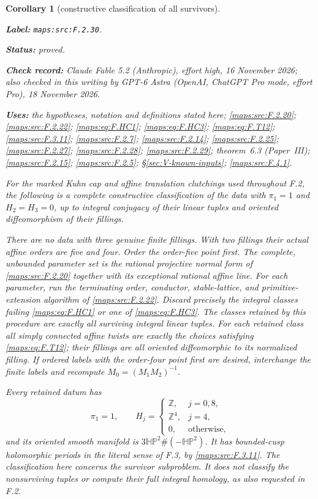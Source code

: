 \documentclass[11pt,a4paper]{article}
\newtheorem{corollary}[corollary]{Corollary}
\theoremstyle{definition}
\newcommand{\StatementRecord}[4]{\par\smallskip\begingroup\upshape\raggedright\noindent\textbf{Label:} \nolinkurl{#1}.\par\noindent\textbf{Status:} #2.\par\noindent\textbf{Check record:} #3.\par\noindent\textbf{Uses:} #4.\par\endgroup\smallskip}
\newcommand{\CurrentChecker}{GPT-6 Astra (OpenAI, ChatGPT Pro mode, effort Pro), 18 November 2026}
\newcommand{\ExternalPaperRef}[3]{\ifmmode\text{\upshape #1#2 (Paper~#3)}\else #1#2 (Paper~#3)\fi}
\begin{document}
\begin{corollary}[constructive classification of all survivors]\label{maps:src:F.2.30}
\StatementRecord{maps:src:F.2.30}{proved}{Claude Fable 5.2 (Anthropic), effort high, 16 November 2026; also checked in this writing by \CurrentChecker}{the hypotheses, notation and definitions stated here; \cref{maps:src:F.2.20}; \cref{maps:src:F.2.22}; \cref{maps:eq:F.HC1}; \cref{maps:eq:F.HC3}; \cref{maps:eq:F.T12}; \cref{maps:src:F.3.11}; \cref{maps:src:F.2.7}; \cref{maps:src:F.2.14}; \cref{maps:src:F.2.25}; \cref{maps:src:F.2.27}; \cref{maps:src:F.2.28}; \cref{maps:src:F.2.29}; \ExternalPaperRef{theorem~}{6.3}{III}; \cref{maps:src:F.2.15}; \cref{maps:src:F.2.5}; \S\ref{sec:V-known-inputs}; \cref{maps:src:F.4.1}}


For the marked Kuhn cap and affine translation clutchings
used throughout F.2, the following is a complete constructive
classification of the data with
$\pi_1=1$ and $H_2=H_3=0$, up to integral conjugacy of their
linear tuples and oriented diffeomorphism of their fillings.

There are no data with three genuine finite fillings.
With two fillings their actual affine orders are five and
four.  Order the order-five point first.
The complete, unbounded parameter set is the rational
projective normal form of \ref{maps:src:F.2.20} together with its
exceptional rational affine line.
For each parameter, run the terminating order,
conductor, stable-lattice, and primitive-extension algorithm
of \ref{maps:src:F.2.22}.  Discard precisely the integral classes failing
\eqref{maps:eq:F.HC1} or one of \eqref{maps:eq:F.HC3}.
The classes retained by this procedure are exactly all
surviving integral linear tuples.
For each retained class all simply connected affine
twists are exactly the choices satisfying \eqref{maps:eq:F.T12};
their fillings are all oriented diffeomorphic to its
normalized filling.
If ordered labels with the order-four point first are
desired, interchange the finite labels and recompute
$M_0=(M_1M_2)^{-1}$.

Every retained datum has
\[
 \pi_1=1,\qquad
 H_j=\begin{cases}
  \mathbb Z,&j=0,8,\\
  \mathbb Z^4,&j=4,\\
  0,&\text{otherwise},
 \end{cases}
 \tag{F.HC13}\label{maps:eq:F.HC13}
\]
and its oriented smooth manifold is
$3\mathbb{HP}^2\#(-\mathbb{HP}^2)$.
It has bounded-cusp holomorphic periods in the literal
sense of F.3, by \ref{maps:src:F.3.11}.
The classification here concerns the survivor subproblem.
It does not classify the nonsurviving tuples or compute
their full integral homology, as also requested in F.2.

\end{corollary}
\end{document}
